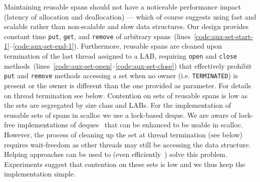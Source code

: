 \documentclass[10pt]{sigplanconf}
\newcommand{\lineRangeRef}[2]{lines~\mbox{\ref{code:#1}--\ref{code:#2}}}
\newcommand{\impl}[1]{{\tt #1}\xspace}
\begin{document}
Maintaining reusable spans should not have a noticeable performance impact
(latency of allocation and deallocation) --- which of course suggests using fast
and scalable rather than non-scalable and slow  data structures. Our design
provides constant time \impl{put}, \impl{get}, and \impl{remove} of arbitrary
spans~(\lineRangeRef{aux-set-start-1}{aux-set-end-1}). Furthermore, reusable
spans are cleaned upon termination of the last thread assigned to a LAB,
requiring \impl{open} and \impl{close}
methods~(\lineRangeRef{aux-set-open}{aux-set-close}) that effectively prohibit
\impl{put} and \impl{remove} methods accessing a set when no owner (i.e.
\impl{TERMINATED}) is present or the owner is different than the one
provided as parameter. For details on thread termination see below. Contention
on sets of reusable spans is low as the sets are segregated by size class and
LABs. For the implementation of reusable sets of spans in scalloc we use a
lock-based deque. We are aware of lock-free implementations of
deques~\cite{Dodds:POPL15} that can be enhanced to be usable in scalloc.
However, the process of cleaning up the set at thread termination (see below)
requires wait-freedom as other threads may still be accessing the data
structure. Helping approaches can be used to (even
efficiently~\cite{Kogan:PPoPP12}) solve this problem. Experiments suggest that
contention on these sets is low and we thus keep the implementation simple.
\end{document}
